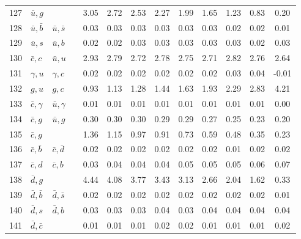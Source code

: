 \begin{tabularx}{\textwidth}{rXXX@{}S@{}S@{}S@{}S@{}S@{}S@{}S@{}S@{}S}
127 & $\bar u, g$      &                   &                  &  3.05 &  2.72 &  2.53 &  2.27 &  1.99 &  1.65 &  1.23 &  0.83 &  0.20 \\
128 & $\bar u, \bar b$ & $\bar u, \bar s$  &                  &  0.03 &  0.03 &  0.03 &  0.03 &  0.03 &  0.03 &  0.02 &  0.02 &  0.01 \\
129 & $\bar u, s$      & $\bar u, b$       &                  &  0.02 &  0.02 &  0.03 &  0.03 &  0.03 &  0.03 &  0.03 &  0.02 &  0.03 \\
130 & $\bar c, c$      & $\bar u, u$       &                  &  2.93 &  2.79 &  2.72 &  2.78 &  2.75 &  2.71 &  2.82 &  2.76 &  2.64 \\
131 & $\gamma, u$      & $\gamma, c$       &                  &  0.02 &  0.02 &  0.02 &  0.02 &  0.02 &  0.02 &  0.03 &  0.04 & -0.01 \\
132 & $g, u$           & $g,  c$           &                  &  0.93 &  1.13 &  1.28 &  1.44 &  1.63 &  1.93 &  2.29 &  2.83 &  4.21 \\
133 & $\bar c, \gamma$ & $\bar u, \gamma$  &                  &  0.01 &  0.01 &  0.01 &  0.01 &  0.01 &  0.01 &  0.01 &  0.01 &  0.00 \\
134 & $\bar c, g$      & $\bar u, g$       &                  &  0.30 &  0.30 &  0.30 &  0.29 &  0.29 &  0.27 &  0.25 &  0.23 &  0.20 \\
135 & $\bar c, g$      &                   &                  &  1.36 &  1.15 &  0.97 &  0.91 &  0.73 &  0.59 &  0.48 &  0.35 &  0.23 \\
136 & $\bar c, \bar b$ & $\bar c, \bar d$  &                  &  0.02 &  0.02 &  0.02 &  0.02 &  0.02 &  0.02 &  0.01 &  0.02 &  0.02 \\
137 & $\bar c, d$      & $\bar c, b$       &                  &  0.03 &  0.04 &  0.04 &  0.04 &  0.05 &  0.05 &  0.05 &  0.06 &  0.07 \\
138 & $\bar d, g$      &                   &                  &  4.44 &  4.08 &  3.77 &  3.43 &  3.13 &  2.66 &  2.04 &  1.62 &  0.33 \\
139 & $\bar d, \bar b$ & $\bar d, \bar s$  &                  &  0.02 &  0.02 &  0.02 &  0.02 &  0.02 &  0.02 &  0.02 &  0.02 &  0.01 \\
140 & $\bar d, s$      & $\bar d, b$       &                  &  0.03 &  0.03 &  0.03 &  0.04 &  0.03 &  0.04 &  0.04 &  0.04 &  0.04 \\
141 & $\bar d, \bar c$ &                   &                  &  0.01 &  0.01 &  0.01 &  0.02 &  0.02 &  0.01 &  0.01 &  0.01 &  0.02 \\

\end{tabularx}
